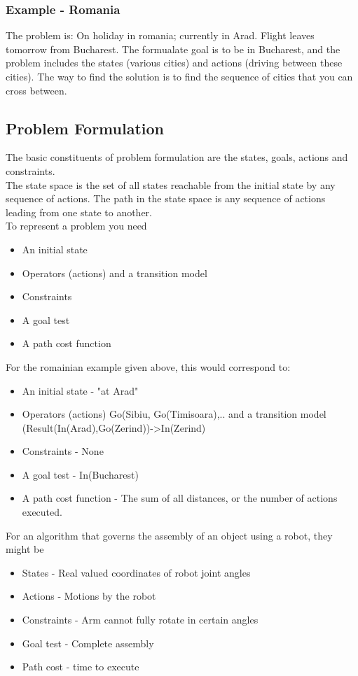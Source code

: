 \documentclass[11pt, oneside]{article}   	%
\begin{document}
\subsubsection{Example - Romania}
The problem is: On holiday in romania; currently in Arad. Flight leaves tomorrow from Bucharest.
The formualate goal is to be in Bucharest, and the problem includes the states (various cities) and actions (driving between these cities). The way to find the solution is to find the sequence of cities that you can cross between.
\subsection{Problem Formulation}
The basic constituents of problem formulation are the states, goals, actions and constraints.\\
The state space is the set of all states reachable from the initial state by any sequence of actions. The path in the state space is any sequence of actions leading from one state to another. 
\\
To represent a problem you need
\begin{itemize}
\item An initial state
\item Operators (actions) and a transition model
\item Constraints
\item A goal test
\item A path cost function
\end{itemize}

For the romainian example given above, this would correspond to:
\begin{itemize}
\item An initial state - "at Arad"
\item Operators (actions) {Go(Sibiu, Go(Timisoara),..} and a transition model (Result(In(Arad),Go(Zerind))->In(Zerind)
\item Constraints - None
\item A goal test - In(Bucharest)
\item A path cost function - The sum of all distances, or the number of actions executed.
\end{itemize}

For an algorithm that governs the assembly of an object using a robot, they might be
\begin{itemize}
\item States - Real valued coordinates of robot joint angles
\item Actions - Motions by the robot
\item Constraints - Arm cannot fully rotate in certain angles
\item Goal test - Complete assembly
\item Path cost - time to execute
\end{itemize}
\end{document}
